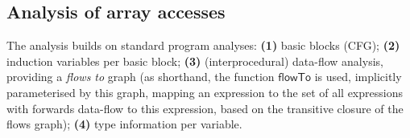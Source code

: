 \subsection{Analysis of array accesses}
\label{subsec:analysis}

\newcommand{\neigh}{\textsf{neigh}}

The analysis builds on standard program analyses:
%
\textbf{(1)} basic blocks (CFG);
\textbf{(2)} induction variables per basic block;
\textbf{(3)} (interprocedural) data-flow analysis, providing a \emph{flows to}
  graph (as shorthand, the function
  $\mathsf{flowTo}$ is used, implicitly parameterised by this graph,
  mapping an expression to the set of all expressions
  with forwards data-flow to this expression, based on the transitive
  closure of the flows graph);
\textbf{(4)} type information per variable.%


